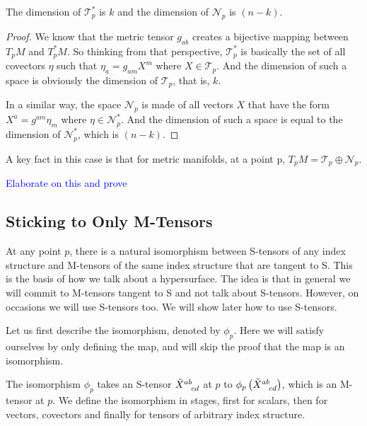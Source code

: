 \begin{proposition}
    The dimension of $\mathscr{T}^*_p$ is $k$ and the dimension of $\mathscr{N}_p$ is $(n-k)$.
\end{proposition}

\begin{proof}
    We know that the metric tensor $g_{ab}$ creates a bijective mapping between $T_pM$ and $T^*_pM$. So thinking from that perspective, $\mathscr{T}^*_p$ is basically the set of all covectors $ \eta$ such that $ \eta_a = g_{am} X^m$ where $X \in \mathscr{T}_p$. And the dimension of such a space is obviously the dimension of $\mathscr{T}_p$, that is, $k$.

    In a similar way, the space $\mathscr{N}_p$ is made of all vectors $X$ that have the form $X^a = g^{am} \eta_m$ where $\eta \in \mathscr{N}^*_p$. And the dimension of such a space is equal to the dimension of $\mathscr{N}^*_p$, which is $(n-k)$.
\end{proof}




A key fact in this case is that for metric manifolds, at a point p, $T_pM = \mathscr{T}_p \oplus \mathscr{N}_p $.

\textcolor{blue}{Elaborate on this and prove}















\subsection{Sticking to Only M-Tensors}

At any point $p$, there is a natural isomorphism between S-tensors of any index structure and M-tensors of the same index structure that are tangent to S. This is the basis of how we talk about a hypersurface. The idea is that in general we will commit to M-tensors tangent to S and not talk about S-tensors. However, on occasions we will use S-tensors too. We will show later how to use S-tensors. 

Let us first describe the isomorphism, denoted by $ \phi_p$. Here we will satisfy ourselves by only defining the map, and will skip the proof that the map is an isomorphism. 

The isomorphism $ \phi_{p}$ takes an S-tensor $ \tt{ \tilde{X}}{ab}{cd}$ at $ p$ to $ \phi_{p} \lera{ \tt{ \tilde{X}}{ab}{cd}}$, which is an M-tensor at $p$. We define the isomorphism in stages, first for scalars, then for vectors, covectors and finally for tensors of arbitrary index structure. 

